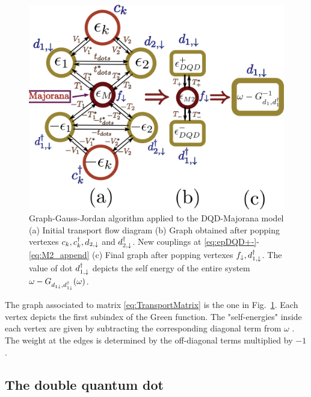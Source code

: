 \documentclass[showpacs,aps,prb,reprint,superscriptaddress]{revtex4-1}
\begin{document}
 

    \begin{figure}[t]
    \begin{center}
    \centering
     \includegraphics[scale=0.29]{Graficos/Graphs-DQD-M-Pro.png}
    \caption{ Graph-Gauss-Jordan algorithm \cite{spielman_algorithms_2010}  applied to the DQD-Majorana model (a) Initial transport flow diagram  (b) Graph obtained after popping vertexes $c_k,c^\dagger_k, d_{2,\downarrow}$ and $ d^\dagger_{2,\downarrow}$. New couplings at \eqref{eq:epDQD+-}-\eqref{eq:M2_append} (c) Final graph after popping vertexes $f_\downarrow, d^\dagger_{1,\downarrow}$. The value of dot $d^\dagger_{1,\downarrow}$ depicts the self energy of the entire system $\omega-G_{d_{1\downarrow},d_{1\downarrow}^\dagger}(\omega)$.  \label{fig:GaussJordanGraph}
    }
    
    \end{center}
    \end{figure}


The graph associated to  matrix \eqref{eq:TransportMatrix} is the one in Fig.\ \ref{fig:GaussJordanGraph}. Each vertex depicts the first subindex of the Green function. The "self-energies" inside each vertex are given by subtracting the corresponding diagonal term from $\omega$ . The weight at the edges is determined by the  off-diagonal terms multiplied by $-1$. 




\subsection{The double quantum dot}
\end{document}
